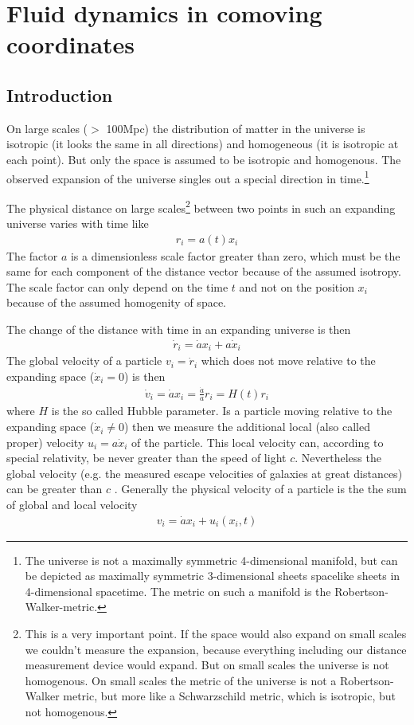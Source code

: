 \documentclass[a4paper,
					fontsize=12pt,
					twoside,
					pagesize,
					cleardoublepage=plain,
					headsepline,
					bibliography=totoc
					]{scrbook}
\newcommand{\fh}{\frac{\dot{a}}{a}}
\begin{document}
\chapter{Fluid dynamics in comoving coordinates}
\section{Introduction}
On large scales ($>$ 100Mpc) the distribution of matter 
in the universe is isotropic (it looks the same in all directions) 
and homogeneous (it is isotropic at each point). But only the space 
is assumed to be isotropic and homogenous. The observed expansion of 
the universe singles out a special direction in time.\footnote{The 
universe is not a maximally symmetric 4-dimensional manifold, but can be 
depicted as maximally symmetric 3-dimensional sheets spacelike sheets 
in 4-dimensional spacetime. The metric on such a manifold is the 
Robertson-Walker-metric.}

The physical distance on large scales\footnote{This is a very important 
point. If the space would also
expand on small scales we couldn't measure the expansion, because everything 
including our distance measurement device would expand. But on small scales
the universe is not homogenous. On small scales the metric of the universe is 
not a Robertson-Walker metric, but more like a Schwarzschild metric, which
is isotropic, but not homogenous.} 
between two points in such an expanding universe varies with time like
\begin{align}
r_i=a(t) x_i
\end{align}
The factor $a$ is a dimensionless scale factor greater than zero, which must 
be the same for each component of the distance vector because of the assumed isotropy.
The scale factor can only depend on the time $t$ and not on the position
$x_i$ because of the assumed homogenity of space. 

The change of the distance with time in an expanding universe is then
\begin{align}
\dot{r}_i = \dot{a} x_i + a \dot{x}_i  
\end{align}
The global velocity of a particle $v_i = \dot{r}_i$ which does not move 
relative to the expanding space ($\dot{x}_i = 0$) is then
\begin{align}
\dot{v}_i = \dot{a} x_i = \fh r_i = H(t) r_i 
\end{align}
where $H$ is the so called Hubble parameter. Is a particle moving relative to
the expanding space ($\dot{x}_i \neq 0$) then we measure the additional 
local (also called proper) velocity $u_i = a \dot{x}_i$ of the particle. This local
velocity can, according to special relativity, be never greater than the speed of light
$c$. Nevertheless the global velocity (e.g. the measured escape velocities of galaxies at 
great distances) can be greater than $c$ \citep{Davis2004}. Generally the physical velocity 
of a particle is the the sum of global and local velocity
\begin{align}
v_i = \dot{a} x_i + u_i (x_i,t)
\end{align}
\end{document}
